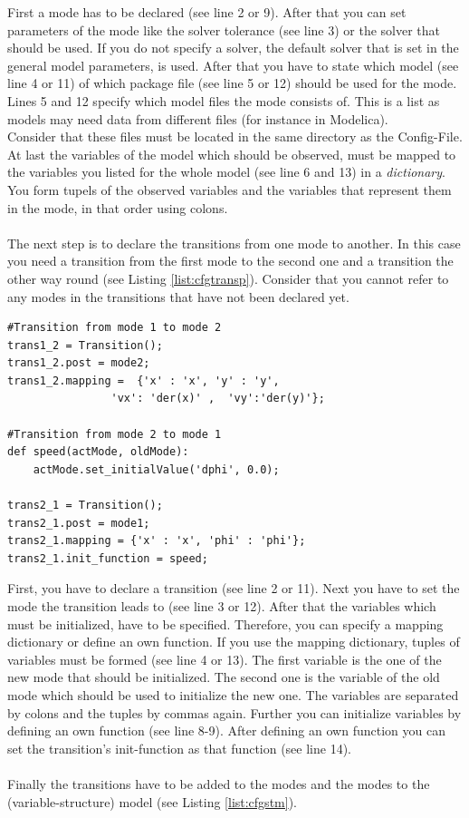 First a mode has to be declared (see line 2 or 9). After that you can set parameters of the mode like the solver tolerance (see line 3) or the solver that should be used. If you do not specify a solver, the default solver that is set in the general model parameters, is used. After that you have to state which model (see line 4 or 11) of which package file (see line 5 or 12) should be used for the mode.
Lines 5 and 12 specify which model files the mode consists of.
This is a list as models may need data from different files (for instance in Modelica).\\
Consider that these files must be located in the same directory as the Config-File. At last the variables of the model which should be observed, must be mapped to the variables you listed for the whole model (see line 6 and 13) in a \textit{dictionary}. You form tupels of the observed variables and the variables that represent them in the mode, in that order using colons.\\
\\
The next step is to declare the transitions from one mode to another. In this case you need a transition from the first mode to the second one and a transition the other way round (see Listing \ref{list:cfgtransp}). Consider that you cannot refer to any modes in the transitions that have not been declared yet.

\lstset{language=python}
\begin{lstlisting}[frame=htrbl, caption={Pendulum Config.py - Transitions}, label={list:cfgtransp}]
#Transition from mode 1 to mode 2
trans1_2 = Transition();
trans1_2.post = mode2;
trans1_2.mapping = 	{'x' : 'x', 'y' : 'y',  
				'vx': 'der(x)' ,  'vy':'der(y)'};

#Transition from mode 2 to mode 1
def speed(actMode, oldMode):
	actMode.set_initialValue('dphi', 0.0);

trans2_1 = Transition();
trans2_1.post = mode1;
trans2_1.mapping = {'x' : 'x', 'phi' : 'phi'};
trans2_1.init_function = speed;
\end{lstlisting}

First, you have to declare a transition (see line 2 or 11). Next you have to set the mode the transition leads to (see line 3 or 12). After that the variables which must be initialized, have to be specified. Therefore, you can specify a mapping dictionary or define an own function. If you use the mapping dictionary, tuples of variables must be formed (see line 4 or 13). The first variable is the one of the new mode that should be initialized. The second one is the variable of the old mode which should be used to initialize the new one. The variables are separated by colons and the tuples by commas again. Further you can initialize variables by defining an own function (see line 8-9). After defining an own function you can set the transition's init-function as that function (see line 14).\\
\\
Finally the transitions have to be added to the modes and the modes to the (variable-structure) model (see Listing \ref{list:cfgstm}).

